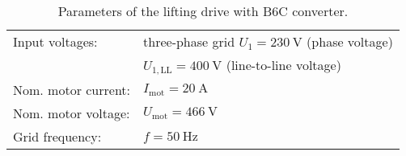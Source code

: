 

\begin{table}[ht]
    \centering  %
    \begin{tabular}{ll}
        \toprule
        Input voltages: & three-phase grid $U_\mathrm{1}=\SI{230}{\volt}$ (phase voltage) \\
                        & $U_\mathrm{1,LL} = \SI{400}{\volt}$ (line-to-line voltage)\\
        Nom. motor current: & $I_{\mathrm{mot}} = \SI{20}{\ampere}$ \\
        Nom. motor voltage: & $U_\mathrm{mot} = \SI{466}{\volt}$ \\ 
        Grid frequency: & $f= \SI{50}{\hertz}$ \\ 
        \bottomrule
    \end{tabular}
    \caption{Parameters of the lifting drive with B6C converter.}  
    \label{table:ex06_Task2_ParametersOfTheCircuit}
\end{table}


